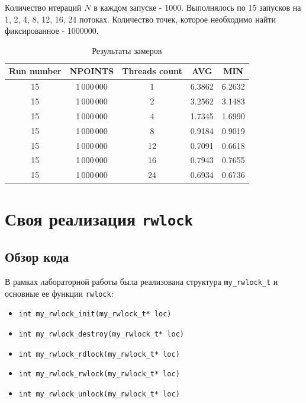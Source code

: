 \documentclass[12pt,a4paper]{article}
\begin{document}
Количество итераций $N$ в каждом запуске - 1000. Выполнялось по 15 запусков на 1, 2, 4, 8, 12, 16, 24 потоках. 
Количество точек, которое необходимо найти фиксированное - 1000000.

\begin{table}[htbp]
  \centering
  \caption{Результаты замеров}
  \label{tab:benchs}
  \begin{tabular}{cccrr}
    \toprule
    Run number & NPOINTS & Threads count & \multicolumn{1}{c}{AVG} & \multicolumn{1}{c}{MIN} \\
    \midrule
    15 & 1\,000\,000 & 1  & 6.3862 & 6.2632 \\
    15 & 1\,000\,000 & 2  & 3.2562 & 3.1483 \\
    15 & 1\,000\,000 & 4  & 1.7345 & 1.6990 \\
    15 & 1\,000\,000 & 8  & 0.9184 & 0.9019 \\
    15 & 1\,000\,000 & 12 & 0.7091 & 0.6618 \\
    15 & 1\,000\,000 & 16 & 0.7943 & 0.7655 \\
    15 & 1\,000\,000 & 24 & 0.6934 & 0.6736 \\
    \bottomrule
  \end{tabular}
\end{table}


\section{Своя реализация \texttt{rwlock}}

\subsection{Обзор кода}

В рамках лабораторной работы была реализована структура \texttt{my\_rwlock\_t} и основные  ее функции \texttt{rwlock}:
\begin{itemize}
  \item \texttt{int my\_rwlock\_init(my\_rwlock\_t* loc)}
  \item \texttt{int my\_rwlock\_destroy(my\_rwlock\_t* loc)}
  \item \texttt{int my\_rwlock\_rdlock(my\_rwlock\_t* loc)}
  \item \texttt{int my\_rwlock\_rwlock(my\_rwlock\_t* loc)}
  \item \texttt{int my\_rwlock\_unlock(my\_rwlock\_t* loc)}
\end{itemize}
\end{document}
